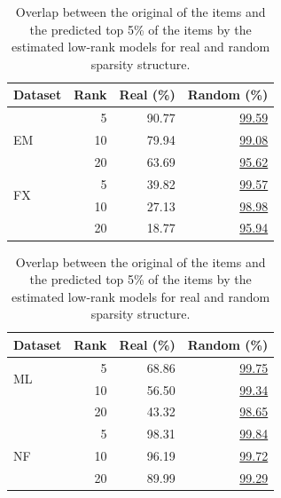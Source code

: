 \begin{table}[bt]
  \centering
  \caption{Overlap between the original \topf of the items and the predicted top
    5\% of the items by the estimated low-rank models for real and random sparsity structure.} 
  \label{table:overlap_table}
  \setlength{\tabcolsep}{.35em}
  \begin{tabular}[t]{lrrr}
    \hline
    Dataset
    & Rank
    & Real (\%)
    & Random (\%) \\
    \hline
    \multirow{3}{*}{EM}      & 5  & 90.77 & \underline{99.59} \\
                              & 10 & 79.94 & \underline{99.08} \\
                              & 20 & 63.69 & \underline{95.62} \\
    \hline
    \multirow{2}{*}{FX}    & 5  & 39.82 & \underline{99.57}  \\
                              & 10 & 27.13 & \underline{98.98} \\
                              & 20 & 18.77 & \underline{95.94} \\
    \hline
  \end{tabular}
  \setlength{\tabcolsep}{.35em}
  \begin{tabular}[t]{lrrr}
    \hline
    Dataset
    & Rank
    & Real (\%)
    & Random (\%) \\
    \hline
    \multirow{2}{*}{ML}    & 5  & 68.86 & \underline{99.75}  \\
                              & 10 & 56.50 & \underline{99.34} \\
                              & 20 & 43.32 & \underline{98.65} \\
    \hline
    \multirow{3}{*}{NF}      & 5  & 98.31 & \underline{99.84} \\
                              & 10 & 96.19 & \underline{99.72}\\
                              & 20 & 89.99 & \underline{99.29} \\
    \hline
  \end{tabular}
\end{table}


